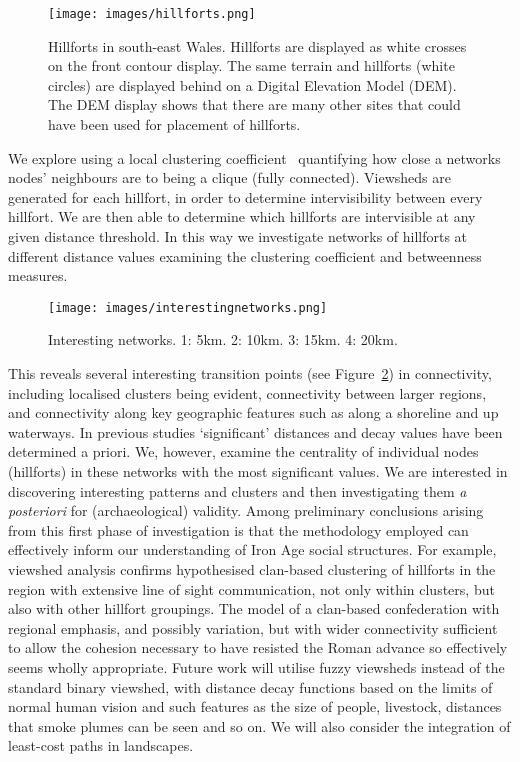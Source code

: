 \documentclass[11pt]{article}
\begin{document}
\begin{figure}[!htp]
\centering
\texttt{[image: images/hillforts.png]}
\caption{Hillforts in south-east Wales. Hillforts are displayed as
  white crosses on the front contour display. The same terrain and
  hillforts (white circles) are displayed behind on a Digital
  Elevation Model (DEM). The DEM display shows that there are many
  other sites that could have been used for placement of hillforts.}
\label{fig:hillforts}
\end{figure}

We explore using a local clustering
coefficient~\citep{watts+strogatz:1998} quantifying how close a
networks nodes’ neighbours are to being a clique (fully connected).
Viewsheds are generated for each hillfort, in order to determine
intervisibility between every hillfort. We are then able to determine
which hillforts are intervisible at any given distance threshold.  In
this way we investigate networks of hillforts at different distance
values examining the clustering coefficient and betweenness measures.

\begin{figure}[!hp]
\centering
\texttt{[image: images/interestingnetworks.png]}
\caption{Interesting networks. 1: 5km. 2: 10km. 3: 15km. 4: 20km.}
\label{fig:intnetworks}
\end{figure}

This reveals several interesting transition points (see
Figure~\ref{fig:intnetworks}) in connectivity, including localised
clusters being evident, connectivity between larger regions, and
connectivity along key geographic features such as along a shoreline
and up waterways.  In previous studies `significant' distances and
decay values have been determined a priori. We, however, examine the
centrality of individual nodes (hillforts) in these networks with the
most significant values. We are interested in discovering interesting
patterns and clusters and then investigating them {\emph{a
posteriori}} for (archaeological) validity.  Among preliminary
conclusions arising from this first phase of investigation is that the
methodology employed can effectively inform our understanding of Iron
Age social structures. For example, viewshed analysis confirms
hypothesised clan-based clustering of hillforts in the region with
extensive line of sight communication, not only within clusters, but
also with other hillfort groupings.  The model of a clan-based
confederation with regional emphasis, and possibly variation, but with
wider connectivity sufficient to allow the cohesion necessary to have
resisted the Roman advance so effectively seems wholly appropriate.
Future work will utilise fuzzy viewsheds instead of the standard
binary viewshed, with distance decay functions based on the limits of
normal human vision and such features as the size of people,
livestock, distances that smoke plumes can be seen and so on. We will
also consider the integration of least-cost paths in landscapes.
\end{document}
